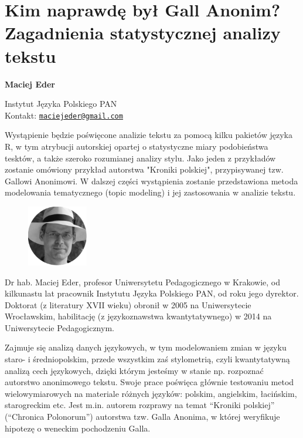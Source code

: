 \documentclass[\main/boa.tex]{subfiles}
\begin{document}
\section{Kim naprawdę był Gall Anonim? Zagadnienia statystycznej analizy tekstu}


\begin{minipage}{0.915\textwidth}
	\centering
  {\bf \LARGE {} Maciej Eder}
\end{minipage}



\begin{affiliations}
\begin{minipage}{0.915\textwidth}
\centering
\large Instytut Języka Polskiego PAN  \\[1pt]
Kontakt: \href{mailto:maciejeder@gmail.com}{\nolinkurl{maciejeder@gmail.com}}\\
\end{minipage}
\end{affiliations}


Wystąpienie będzie poświęcone analizie tekstu za pomocą kilku pakietów języka R, w tym atrybucji autorskiej opartej o statystyczne miary podobieństwa tesktów, a także szeroko rozumianej analizy stylu. Jako jeden z przykładów zostanie omówiony przykład autorstwa "Kroniki polskiej", przypisywanej tzw. Gallowi Anonimowi. W dalszej części wystąpienia zostanie przedstawiona metoda modelowania tematycznego (topic modeling) i jej zastosowania w analizie tekstu. 

\bio
\begin{figure}
    \includegraphics[width=100px]{img/guests/czarno_biale/meder-crop.png}
\end{figure} 
Dr hab. Maciej Eder, profesor Uniwersytetu Pedagogicznego w Krakowie, od kilkunastu lat pracownik Instytutu Języka Polskiego PAN, od roku jego dyrektor. Doktorat (z literatury XVII wieku) obronił w 2005 na Uniwersytecie Wrocławskim, habilitację (z językoznawstwa kwantytatywnego) w 2014 na Uniwersytecie Pedagogicznym.

Zajmuje się analizą danych językowych, w tym modelowaniem zmian w języku staro- i średniopolskim, przede wszystkim zaś stylometrią, czyli kwantytatywną analizą cech językowych, dzięki którym jesteśmy w stanie np. rozpoznać autorstwo anonimowego tekstu. Swoje prace poświęca głównie testowaniu metod wielowymiarowych na materiale różnych języków: polskim, angielskim, łacińskim, starogreckim etc. Jest m.in. autorem rozprawy na temat “Kroniki polskiej” (“Chronica Polonorum”) autorstwa tzw. Galla Anonima, w której weryfikuje hipotezę o weneckim pochodzeniu Galla.
\end{document}
